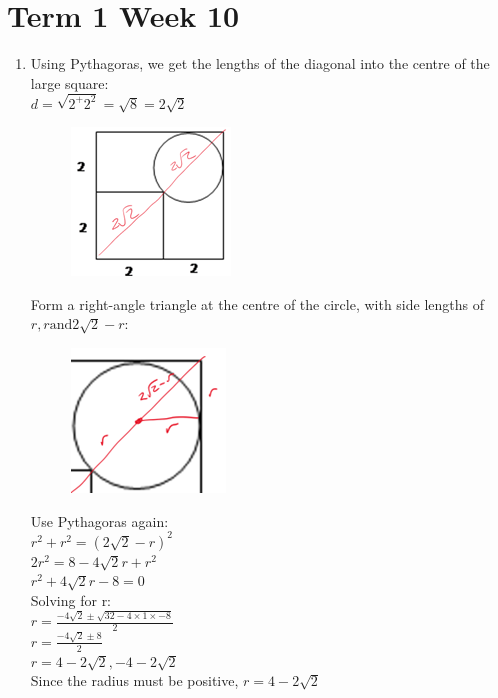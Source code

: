 \documentclass[../main.tex]{subfiles}
\begin{document}
\section*{Term 1 Week 10}
\begin{enumerate}
    \item 
    Using Pythagoras, we get the lengths of the diagonal into the centre of the large square:\\
    \(d=\sqrt{2^+2^2}=\sqrt{8}=2\sqrt{2}\)
    \begin{figure}[H]
        \centering
        \includegraphics[width=0.2\linewidth]{images/t1w10q1_a1.png}
    \end{figure}
    Form a right-angle triangle at the centre of the circle, with side lengths of \(r, r \text{and} 2\sqrt{2}-r\):
    \begin{figure}[H]
        \centering
        \includegraphics[width=0.2\linewidth]{images/t1w10q1_a2.png}
    \end{figure}

    Use Pythagoras again:\\
    \(r^2 + r^2=(2\sqrt{2}-r)^2\)\\
    \(2r^2=8-4\sqrt{2}r+r^2\)\\
    \(r^2+4\sqrt{2}r-8=0\)\\
    Solving for r:\\
    \(r=\frac{-4\sqrt{2}\pm \sqrt{32-4\times 1\times -8}}{2}\)\\
    \(r=\frac{-4\sqrt{2}\pm 8}{2}\)\\
    \(r=4-2\sqrt{2}, -4-2\sqrt{2}\)\\
    Since the radius must be positive, \(r=4-2\sqrt{2}\)\\


\end{enumerate}
\end{document}
